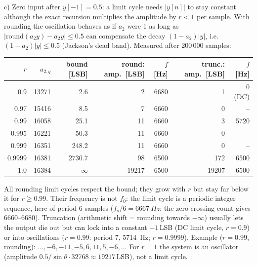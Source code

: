 \begin{solution}
c) Zero input after $y[-1]=0.5$: a limit cycle needs $|y[n]|$ to stay constant
although the exact recursion multiplies the amplitude by $r<1$ per sample. With
rounding the oscillation behaves as if $a_2$ were 1 as long as
$|\mathrm{round}(a_2y)-a_2y|\le0.5$ can compensate the decay $(1-a_2)|y|$,
i.e.\ $(1-a_2)|y|\le0.5$ (Jackson's dead band). Measured after 200\,000 samples:
\begin{center}\small
\begin{tabular}{rrrrrrr}
\toprule
$r$ & $a_{2,q}$ & bound [LSB] & round: amp.\ [LSB] & $f$ [Hz] & trunc.: amp.\ [LSB] & $f$ [Hz]\\
\midrule
0.9 & 13271 & 2.6 & 2 & 6680 & 1 & 0 (DC)\\
0.97 & 15416 & 8.5 & 7 & 6660 & 0 & --\\
0.99 & 16058 & 25.1 & 11 & 6660 & 3 & 5720\\
0.995 & 16221 & 50.3 & 11 & 6660 & 0 & --\\
0.999 & 16351 & 248.2 & 11 & 6660 & 0 & --\\
0.9999 & 16381 & 2730.7 & 98 & 6500 & 172 & 6500\\
1.0 & 16384 & $\infty$ & 19217 & 6500 & 19207 & 6500\\
\bottomrule
\end{tabular}
\end{center}
All rounding limit cycles respect the bound; they grow with $r$ but stay far
below it for $r\ge0.99$. Their frequency is not $f_0$: the limit cycle is a
periodic integer sequence, here of period 6 samples
($f_s/6=\SI{6667}{Hz}$; the zero-crossing count gives 6660--6680). Truncation
(arithmetic shift = rounding towards $-\infty$) usually lets the output die out
but can lock into a constant $-1$\,LSB (DC limit cycle, $r=0.9$) or into
oscillations ($r=0.99$: period 7, \SI{5714}{Hz}; $r=0.9999$). Example
($r=0.99$, rounding): $\dots,-6,-11,-5,6,11,5,-6,\dots$ For $r=1$ the system is an oscillator
(amplitude $0.5/\sin\theta\cdot32768\approx19217$\,LSB), not a limit cycle.


\end{solution}
